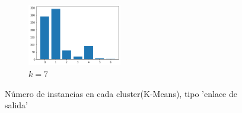 \begin{figure}[H]
\begin{subfigure}{.5\textwidth}
\end{subfigure}
\begin{subfigure}{.5\textwidth}
  \centering
  \includegraphics[width=0.45\textwidth]{imagenes/counter/salida/km7.png}
  \caption{$k=7$}
\end{subfigure}
\caption{Número de instancias en cada cluster(K-Means), tipo 'enlace de salida'}
\label{fig:hm-km}
\end{figure}


